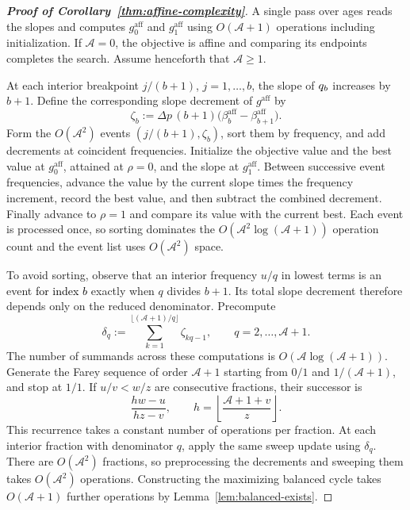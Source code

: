 \begin{proof}[\normalfont\bfseries Proof of Corollary~\ref{thm:affine-complexity}]
A single pass over ages reads the slopes and computes \(g_0^{\mathrm{aff}}\) and \(g_1^{\mathrm{aff}}\) using \(O(\mathcal A+1)\) operations including initialization. If \(\mathcal A=0\), the objective is affine and comparing its endpoints completes the search. Assume henceforth that \(\mathcal A\ge1\).

    At each interior breakpoint \(j/(b+1)\), \(j=1,\ldots,b\), the slope of \(\textcolor{black}{q_b}\) increases by \(b+1\). Define the corresponding slope decrement of \(g^{\mathrm{aff}}\) by
    \[
        \zeta_b:=\Delta p\,(b+1)
        \bigl(\beta_b^{\mathrm{aff}}-\beta_{b+1}^{\mathrm{aff}}\bigr).
    \]
    Form the \(O(\mathcal A^2)\) events \((j/(b+1),\zeta_b)\), sort them by frequency, and add decrements at coincident frequencies. Initialize the objective value and the best value at \(g_0^{\mathrm{aff}}\), attained at \(\rho=0\), and the slope at \(g_1^{\mathrm{aff}}\). Between successive event frequencies, advance the value by the current slope times the frequency increment, record the best value, and then subtract the combined decrement. Finally advance to \(\rho=1\) and compare its value with the current best. Each event is processed once, so sorting dominates the \(O(\mathcal A^2\log(\mathcal A+1))\) operation count and the event list uses \(O(\mathcal A^2)\) space.

    To avoid sorting, observe that an interior frequency \(u/q\) in lowest terms is an event \textcolor{black}{for index \(b\)} exactly when \(q\) divides \(b+1\). Its total slope decrement therefore depends only on the reduced denominator. Precompute
    \[
        \delta_q:=\sum_{k=1}^{\lfloor(\mathcal A+1)/q\rfloor}\zeta_{kq-1},
        \qquad q=2,\ldots,\mathcal A+1.
    \]
    The number of summands across these computations is \(O(\mathcal A\log(\mathcal A+1))\). Generate the Farey sequence of order \(\mathcal A+1\) starting from \(0/1\) and \(1/(\mathcal A+1)\), and stop at \(1/1\). If \(u/v<w/z\) are consecutive fractions, their successor is
    \[
        \frac{hw-u}{hz-v},
        \qquad h=\left\lfloor\frac{\mathcal A+1+v}{z}\right\rfloor.
    \]
    This recurrence takes a constant number of operations per fraction. At each interior fraction with denominator \(q\), apply the same sweep update using \(\delta_q\). There are \(O(\mathcal A^2)\) fractions, so preprocessing the decrements and sweeping them takes \(O(\mathcal A^2)\) operations. Constructing the maximizing balanced cycle takes \(O(\mathcal A+1)\) further operations by Lemma~\ref{lem:balanced-exists}.
\end{proof}


